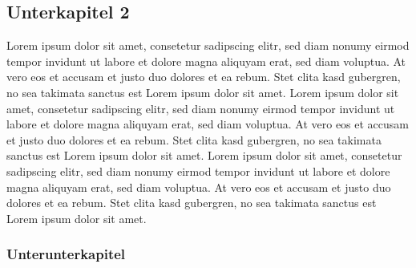 \subsection{Unterkapitel 2}

Lorem ipsum dolor sit amet, consetetur sadipscing elitr, sed diam nonumy eirmod tempor invidunt ut labore et dolore magna aliquyam erat, sed diam voluptua. At vero eos et accusam et justo duo dolores et ea rebum. Stet clita kasd gubergren, no sea takimata sanctus est Lorem ipsum dolor sit amet. Lorem ipsum dolor sit amet, consetetur sadipscing elitr, sed diam nonumy eirmod tempor invidunt ut labore et dolore magna aliquyam erat, sed diam voluptua. At vero eos et accusam et justo duo dolores et ea rebum. Stet clita kasd gubergren, no sea takimata sanctus est Lorem ipsum dolor sit amet. Lorem ipsum dolor sit amet, consetetur sadipscing elitr, sed diam nonumy eirmod tempor invidunt ut labore et dolore magna aliquyam erat, sed diam voluptua. At vero eos et accusam et justo duo dolores et ea rebum. Stet clita kasd gubergren, no sea takimata sanctus est Lorem ipsum dolor sit amet.   

\subsubsection{Unterunterkapitel}
